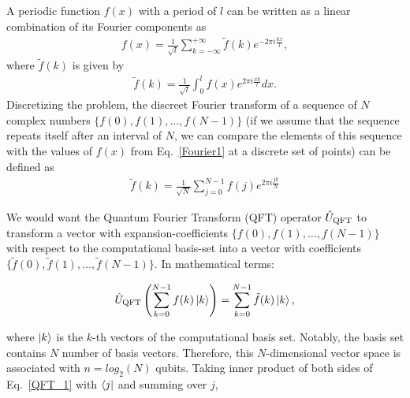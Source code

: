 \documentclass[12pt,oneside]{book}
\begin{document}
A periodic function $f(x)$ with a period of $l$ can be written as a linear combination of its Fourier components as
\begin{align}\label{Fourier1}
    f(x)=\frac{1}{\sqrt{l}}\sum_{k=-\infty}^{+\infty} \tilde{f}(k) e^{-2\pi i\frac{kx}{l}},
\end{align}
where $\tilde{f}(k)$ is given by
\begin{align}
    \tilde{f}(k) = \frac{1}{\sqrt{l}}\int_0^l f(x) e^{2\pi i \frac{xk}{l}} dx.
\end{align}
Discretizing the problem, the discreet Fourier transform of a sequence of $N$ complex numbers $\{f(0),f(1),\hdots,f(N-1)\}$ (if we assume that the sequence repeats itself after an interval of $N$, we can compare the elements of this sequence with the values of $f(x)$ from Eq.~\ref{Fourier1} at a discrete set of points) can be defined as
\begin{align}\label{Fourier_tilde_expansion}
    \tilde{f}(k) = \frac{1}{\sqrt{N}} \sum_{j=0}^{N-1} f(j) e^{2\pi i \frac{jk}{N}}
\end{align}

We would want the Quantum Fourier Transform (QFT) operator $\hat{U}_{\rm{QFT}}$ to transform a vector with expansion-coefficients $\{f(0),f(1),\hdots,f(N-1)\}$ with respect to the computational basis-set into a vector with coefficients $\{\tilde{f}(0),\tilde{f}(1),\hdots,\tilde{f}(N-1)\}$. In mathematical terms:

\begin{align}\label{QFT_1}
    \hat{U}_{\rm{QFT}} \left(\sum_{k=0}^{N-1} f(k)\ket{k}\right) = \sum_{k=0}^{N-1}\tilde{f}(k)\ket{k},
\end{align}

where $\ket{k}$ is the $k$-th vectors of the computational basis set. Notably, the basis set contains $N$ number of basis vectors. Therefore, this $N$-dimensional vector space is associated with $n=log_2(N)$ qubits. Taking inner product of both sides of Eq.~\ref{QFT_1} with $\bra{j}$ and summing over $j$,
\end{document}
